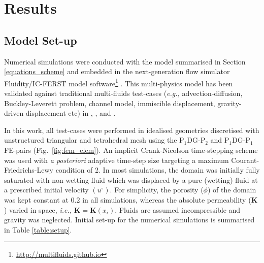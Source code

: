\documentclass[preprint,authoryear,12pt]{elsarticle}
\newcommand{\PN}[2][error]{P$_{#1}$DG-P$_{#2}$}
\newcommand{\eg}{{\it e.g., }}
\newcommand{\ie}{{\it i.e., }}
\begin{document}
 




%

 

\section{Results}\label{section:results} 

\subsection{Model Set-up}\label{section:results_setup} 
Numerical simulations were conducted with the model summarised in Section \ref{equations_scheme} and embedded in the next-generation flow simulator Fluidity/IC-FERST model software\footnote{\href{http://multifluids.github.io}{http://multifluids.github.io}} \citep[a full description of the model can be found in][]{jackson_2013,gomes_2017}. This multi-physics model has been validated against traditional multi-fluids test-cases (\eg advection-diffusion, Buckley-Leverett problem, channel model, immiscible displacement, gravity-driven displacement etc) in \citet{radunz_2014}, \citet{jackson_2015}, \citet{salinas2015} and \citet{pavlidis2016}.

\medskip
In this work, all test-cases were performed in idealised geometries discretised with unstructured triangular and tetrahedral mesh using the \PN[1]{2} and \PN[1]{1} FE-pairs (Fig.~\ref{fig:fem_elem}). An implicit Crank-Nicolson time-stepping scheme was used with {\it a posteriori} adaptive time-step size targeting a maximum Courant-Friedrichs-Lewy condition \citep[CFL,][]{courant_1941} of 2. In most simulations, the domain was initially fully saturated with non-wetting fluid which was displaced by a pure (wetting) fluid at a prescribed initial velocity $\left(u^{\circ}\right)$. For simplicity, the porosity ($\phi$) of the domain was kept constant at 0.2 in all simulations, whereas the absolute permeability ($\mathbf{K}$) varied in space, \ie $\mathbf{K}=\mathbf{K}\left(x_{i}\right)$. Fluids are assumed incompressible and gravity was neglected. Initial set-up for the numerical simulations is summarised in Table \ref{table:setup}.
 
\end{document}
